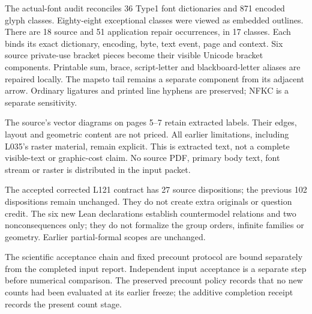 \documentclass[10pt]{article}
\begin{document}
The actual-font audit reconciles 36 Type1 font dictionaries and 871 encoded
glyph classes. Eighty-eight exceptional classes were viewed as embedded outlines.
There are 18 source and 51 application repair occurrences, in 17 classes.
Each binds its exact dictionary, encoding, byte, text event, page and context.
Six source private-use bracket pieces become their visible Unicode bracket
components. Printable sum, brace, script-letter and blackboard-letter aliases
are repaired locally. The mapsto tail remains a separate component from its
adjacent arrow. Ordinary ligatures and printed line hyphens are preserved;
NFKC is a separate sensitivity.

The source's vector diagrams on pages 5--7 retain extracted labels. Their
edges, layout and geometric content are not priced. All earlier limitations,
including L035's raster material, remain explicit. This is extracted text,
not a complete visible-text or graphic-cost claim. No source PDF, primary body
text, font stream or raster is distributed in the input packet.

The accepted corrected L121 contract has 27 source dispositions; the previous
102 dispositions remain unchanged. They do not create extra originals or
question credit. The six new Lean declarations establish countermodel relations
and two nonconsequences only; they do not formalize the group orders, infinite
families or geometry. Earlier partial-formal scopes are unchanged.

The scientific acceptance chain and fixed precount protocol are bound separately
from the completed input report. Independent input acceptance is a separate
step before numerical comparison. The preserved precount policy records that
no new counts had been evaluated at its earlier freeze; the additive completion
receipt records the present count stage.
\end{document}

